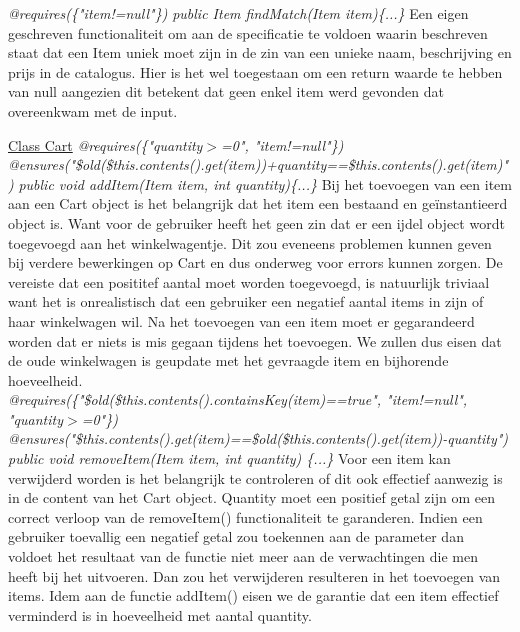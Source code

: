 \documentclass{article}
\begin{document}
\noindent
\textit{@requires(\{"item!=null"\})}\newline
\textit{public Item findMatch(Item item)\{...\}}\newline
Een eigen geschreven functionaliteit om aan de specificatie te voldoen waarin beschreven staat dat een Item uniek moet zijn in de zin van een unieke naam, beschrijving en prijs in de catalogus. Hier is het wel toegestaan om een return waarde te hebben van null aangezien dit betekent dat geen enkel item werd gevonden dat overeenkwam met de input. \\

\newpage

\noindent
\underline{Class Cart}\newline
\textit{@requires(\{"quantity$>$=0", "item!=null"\})}\newline
\textit{@ensures("\$old(\$this.contents().get(item))+quantity==\$this.contents().get(item)")}\newline
\textit{public void addItem(Item item, int quantity)\{...\}}\newline
Bij het toevoegen van een item aan een Cart object is het belangrijk dat het item een bestaand en ge\"{i}nstantieerd object is. Want voor de gebruiker heeft het geen zin dat er een ijdel object wordt toegevoegd aan het winkelwagentje. Dit zou eveneens problemen kunnen geven bij verdere bewerkingen op Cart en dus onderweg voor errors kunnen zorgen. De vereiste dat een posititef aantal moet worden toegevoegd, is natuurlijk triviaal want het is onrealistisch dat een gebruiker een negatief aantal items in zijn of haar winkelwagen wil.\newline
Na het toevoegen van een item moet er gegarandeerd worden dat er niets is mis gegaan tijdens het toevoegen. We zullen dus eisen dat de oude winkelwagen is geupdate met het gevraagde item en bijhorende hoeveelheid. \\

\noindent
\textit{@requires(\{"\$old(\$this.contents().containsKey(item)==true", "item!=null", "quantity$>$=0"\})} \newline
\textit{@ensures("\$this.contents().get(item)==\$old(\$this.contents().get(item))-quantity")} \newline
\textit{public void removeItem(Item item, int quantity) \{...\}} \newline
Voor een item kan verwijderd worden is het belangrijk te controleren of dit ook effectief aanwezig is in de content van het Cart object. Quantity moet een positief getal zijn om een correct verloop van de removeItem() functionaliteit te garanderen. Indien een gebruiker toevallig een negatief getal zou toekennen aan de parameter dan voldoet het resultaat van de functie niet meer aan de verwachtingen die men heeft bij het uitvoeren. Dan zou het verwijderen resulteren in het toevoegen van items. Idem aan de functie addItem() eisen we de garantie dat een item effectief verminderd is in hoeveelheid met aantal quantity. \\
\end{document}
